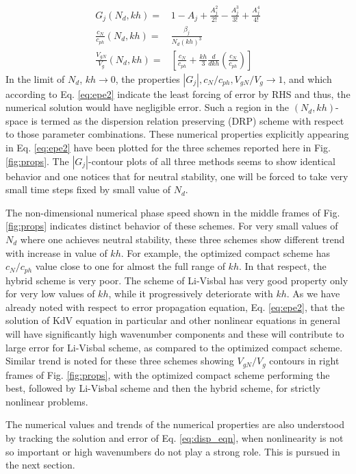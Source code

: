 \documentclass{svjour3}                    %
\begin{document}
\begin{align}
\label{eq:G}
G_j(N_d,kh) = & 1 - A_j + \frac{A_j^2}{2!} -\frac{A_j^3}{3!} + \frac{A_j^4}{4!} \\
\label{eq:cn_cph}
\frac{c_N}{c_{ph}}(N_d,kh) = & \frac{\beta_j}{N_d(kh)^3}\\
\label{eq:vg}
\frac{V_{gN}}{V_g}(N_d,kh) = & \left[\frac{c_N}{c_{ph}} + \frac{kh}{3} \frac{d}{dkh} \left( \frac{c_N}{c_{ph}} \right) \right]
\end{align}
In the limit of $N_d$, $kh \to 0$, the properties $|G_j|,c_N/c_{ph},V_{gN}/V_g \to 1$, and which according to Eq. \eqref{eq:epe2} indicate 
the least forcing of error by RHS and thus, the numerical solution would have negligible error. Such a region in the $(N_d, kh)$-space is termed 
as the dispersion relation preserving (DRP) scheme with respect to those parameter combinations. These numerical properties explicitly appearing 
in Eq. \eqref{eq:epe2} have been plotted for the three schemes reported here in Fig. \ref{fig:props}. The $|G_j|$-contour plots of all three methods 
seems to show identical behavior and one notices that for neutral stability, one will be forced to take very small time steps fixed by small value 
of $N_d$. 

The non-dimensional numerical phase speed shown in the middle frames of Fig. \ref{fig:props} indicates distinct behavior of these schemes. For
very small values of $N_d$ where one achieves neutral stability, these three schemes show different trend with increase in value of $kh$. For example, 
the optimized compact scheme has $c_N/c_{ph}$ value close to one for almost the full range of $kh$. In that respect, the hybrid scheme is very poor.
The scheme of Li-Visbal has very good property only for very low values of $kh$, while it progressively deteriorate with $kh$. As we have already 
noted with respect to error propagation equation, Eq. \eqref{eq:epe2}, that the solution of KdV equation in particular and other nonlinear equations
in general will have significantly high wavenumber components and these will contribute to large error for Li-Visbal scheme, as compared to the 
optimized compact scheme. Similar trend is noted for these three schemes showing $V_{gN}/V_g$ contours in right frames of Fig. \ref{fig:props}, 
with the optimized compact scheme performing the best, followed by Li-Visbal scheme and then the hybrid scheme, for strictly nonlinear problems.    

The numerical values and trends of the numerical properties are also understood by tracking the solution and error of Eq. \eqref{eq:disp_eqn}, when
nonlinearity is not so important or high wavenumbers do not play a strong role. This is pursued in the next section. 
\end{document}

